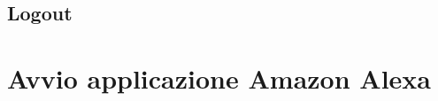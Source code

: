 \subsection{Logout}

\newpage
\section{Avvio applicazione Amazon Alexa}
\label{Avviso Amazon Alexa}
